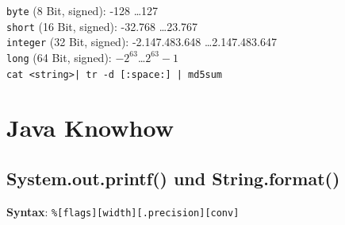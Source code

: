 \documentclass[10pt,a4paper,ngerman,oneside,]{article}
\begin{document}
\begin{multicols}{2}
{}

\vspace{1em}
\noindent
\texttt{byte} (8 Bit, signed): -128 \dots 127\\
\texttt{short} (16 Bit, signed): -32.768 \dots 23.767\\
\texttt{integer} (32 Bit, signed): -2.147.483.648 \dots 2.147.483.647\\
\texttt{long} (64 Bit, signed): $-2^{63}$\dots $2^{63}-1$\\

\newcommand{\hash}[1]{{\bfseries MD5:} ~\texttt{#1}}
\vspace{1.2em} \texttt{\small cat <string>| tr -d [:space:] | md5sum}\\

\newpage
\newpage
\end{multicols}

\section{Java Knowhow}
\subsection{System.out.printf() und String.format()}
\textbf{Syntax}: \texttt{\%[flags][width][.precision][conv]}
\end{document}
